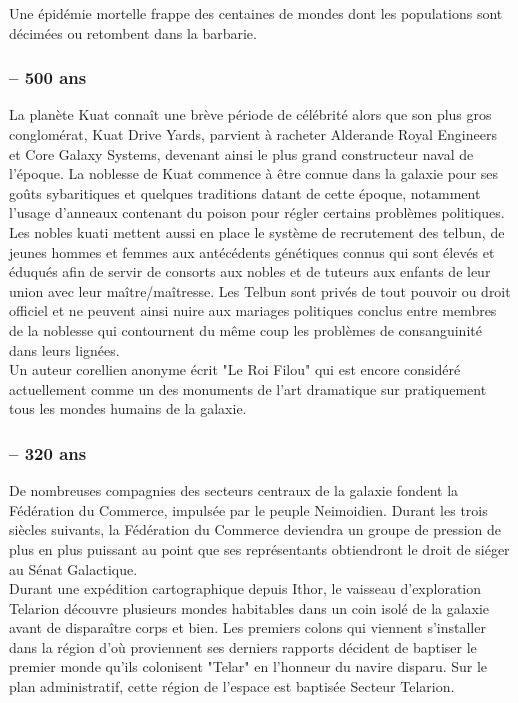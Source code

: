 \documentclass[twoside]{article}
\begin{document}
Une épidémie mortelle frappe des centaines de mondes dont les populations sont décimées ou retombent dans la barbarie. 
\subsubsection*{-- 500 ans} 
La planète Kuat conna\^{i}t une brève période de célébrité alors que son plus gros conglomérat, Kuat Drive Yards, parvient à racheter Alderande Royal Engineers et Core Galaxy Systems, devenant ainsi le plus grand constructeur naval de l'époque. La noblesse de Kuat commence à être connue dans la galaxie pour ses goûts sybaritiques et quelques traditions datant de cette époque, notamment l'usage d'anneaux contenant du poison pour régler certains problèmes politiques. Les nobles kuati mettent aussi en place le système de  recrutement des telbun, de jeunes hommes et femmes aux antécédents génétiques connus qui sont élevés et  éduqués afin de servir de consorts aux nobles et de tuteurs aux enfants de leur union avec leur ma\^{i}tre/ma\^{i}tresse. Les Telbun sont privés de tout pouvoir ou droit officiel et ne peuvent ainsi nuire aux mariages politiques conclus entre membres de la noblesse qui contournent du même coup les problèmes de consanguinité dans leurs lignées.\\

Un auteur corellien anonyme écrit  "Le Roi Filou" qui est encore considéré actuellement comme un des monuments de l'art dramatique sur pratiquement tous les mondes humains de la galaxie. 
\subsubsection*{-- 320 ans} 
De nombreuses compagnies des secteurs centraux de la galaxie fondent la Fédération du Commerce, impulsée par le peuple Neimoidien. Durant les trois siècles suivants, la Fédération du Commerce deviendra un groupe de pression de plus en plus puissant au point que ses représentants obtiendront le droit de siéger au Sénat Galactique.\\
  
Durant une expédition cartographique depuis Ithor, le vaisseau d'exploration Telarion découvre plusieurs mondes habitables dans un coin isolé de la galaxie avant de dispara\^{i}tre corps et bien. Les premiers colons qui viennent s'installer dans la région d'où proviennent ses derniers rapports décident de baptiser le premier monde qu'ils colonisent "Telar" en l'honneur du navire disparu. Sur le plan administratif, cette région de l'espace est baptisée Secteur Telarion. 
\end{document}
